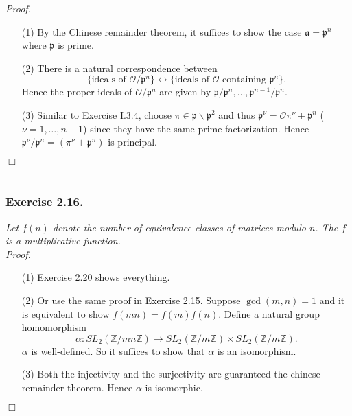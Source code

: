 \documentclass{article}
\begin{document}
\emph{Proof.}
\begin{enumerate}
\item[(1)]
  By the Chinese remainder theorem,
  it suffices to show the case $\mathfrak{a} = \mathfrak{p}^n$ where $\mathfrak{p}$ is prime.

\item[(2)]
  There is a natural correspondence between
  \[
    \{ \text{ideals of $\mathcal{O}/\mathfrak{p}^n$} \}
    \longleftrightarrow
    \{ \text{ideals of $\mathcal{O}$ containing $\mathfrak{p}^n$} \}.
  \]
  Hence the proper ideals of $\mathcal{O}/\mathfrak{p}^n$
  are given by $\mathfrak{p}/\mathfrak{p}^n, \ldots, \mathfrak{p}^{n-1}/\mathfrak{p}^n$.

\item[(3)]
  Similar to Exercise I.3.4,
  choose $\pi \in \mathfrak{p} \smallsetminus \mathfrak{p}^2$
  and thus $\mathfrak{p}^{\nu} = \mathcal{O}\pi^{\nu} + \mathfrak{p}^n$
  ($\nu = 1, \ldots, n-1$)
  since they have the same prime factorization.
  Hence
  $\mathfrak{p}^{\nu}/\mathfrak{p}^n = (\pi^{\nu} + \mathfrak{p}^n)$ is principal.
\end{enumerate}
$\Box$ \\\\






\subsubsection*{Exercise 2.16.}
\emph{Let $f(n)$ denote the number of equivalence classes of matrices modulo $n$.
The $f$ is a multiplicative function.} \\



\emph{Proof.}
\begin{enumerate}
\item[(1)]
  Exercise 2.20 shows everything.

\item[(2)]
  Or use the same proof in Exercise 2.15.
  Suppose $\gcd(m,n) = 1$ and it is equivalent to show $f(mn) = f(m)f(n)$.
  Define a natural group homomorphism
  \[
    \alpha:
    SL_2(\mathbb{Z}/mn\mathbb{Z})
    \to
    SL_2(\mathbb{Z}/m\mathbb{Z}) \times SL_2(\mathbb{Z}/m\mathbb{Z}).
  \]
  $\alpha$ is well-defined.
  So it suffices to show that $\alpha$ is an isomorphism.

\item[(3)]
  Both the injectivity and the surjectivity are guaranteed the chinese remainder theorem.
  Hence $\alpha$ is isomorphic.
\end{enumerate}
$\Box$ \\\\
\end{document}
